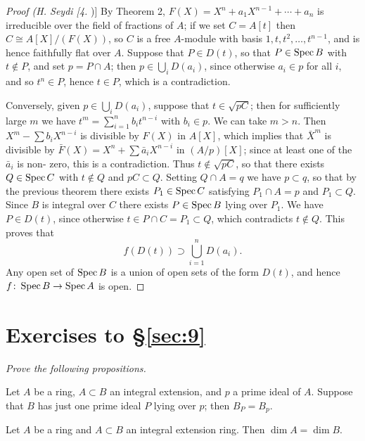 \begin{proof}[Proof (H. Seydi [4])]
By Theorem 2, $F(X) = X^n + a_1X^{n-1} + \cdots + a_n$ is
irreducible over the field of fractions of $A$; if we set $C = A[t]$ then
$C \cong A[X]/(F(X))$, so $C$ is a free $A$-module with basis $1, t, t^2, \ldots, t^{n-1}$, and
is hence faithfully flat over $A$. Suppose that $P \in D(t)$, so that $P \in \operatorname{Spec} B$
with $t \notin P$, and set $p = P \cap A$; then $p \in \bigcup_i D(a_i)$, since otherwise $a_i \in p$ for
all $i$, and so $t^n \in P$, hence $t \in P$, which is a contradiction.

Conversely, given $p \in \bigcup_i D(a_i)$, suppose that $t \in \sqrt{pC}$; then for sufficiently
large $m$ we have $t^m = \sum_{i=1}^{n} b_it^{n-i}$ with $b_i \in p$. We can take $m > n$. Then $X^m
- \sum b_iX^{n-i}$ is divisible by $F(X)$ in $A[X]$, which implies that $\bar{X}^m$ is divisible
by $\bar{F}(X) = X^n + \sum \bar{a}_iX^{n-i}$ in $(A/p)[X]$; since at least one of the $\bar{a}_i$ is non-
zero, this is a contradiction. Thus $t \notin \sqrt{pC}$, so that there exists $Q \in \operatorname{Spec} C$
with $t \notin Q$ and $pC \subset Q$. Setting $Q \cap A = q$ we have $p \subset q$, so that by
the previous theorem there exists $P_1 \in \operatorname{Spec} C$ satisfying $P_1 \cap A = p$ and $P_1 \subset Q$.
Since $B$ is integral over $C$ there exists $P \in \operatorname{Spec} B$ lying over $P_1$. We have
$P \in D(t)$, since otherwise $t \in P \cap C = P_1 \subset Q$, which contradicts $t \notin Q$. This
proves that
\[
  f(D(t)) \supset \bigcup_{i=1}^{n} D(a_i).
\]
Any open set of $\operatorname{Spec} B$ is a union of open sets of the form $D(t)$, and hence
$f\colon \operatorname{Spec} B \to \operatorname{Spec} A$ is open.
\end{proof}

\section*{Exercises to \S\ref{sec:9}}
\emph{Prove the following propositions.}

\begin{exercise}\label{ex:9.1-ex}
Let $A$ be a ring, $A \subset B$ an integral extension, and $p$ a prime ideal of $A$.
Suppose that $B$ has just one prime ideal $P$ lying over $p$; then $B_P = B_p$.
\end{exercise}

\begin{exercise}\label{ex:9.2-ex}
Let $A$ be a ring and $A \subset B$ an integral extension ring. Then $\dim A =
\dim B$.
\end{exercise}

